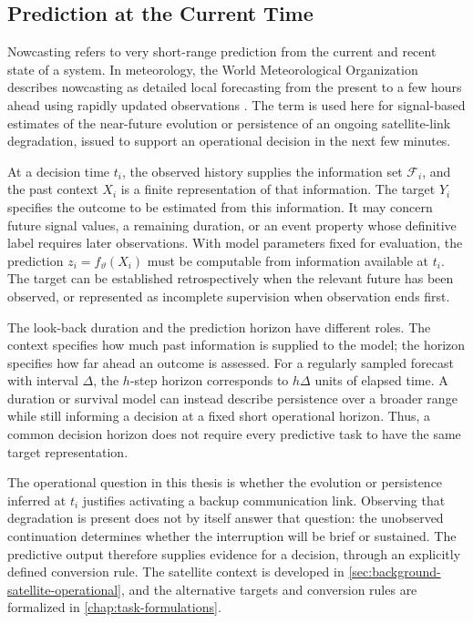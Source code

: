 \subsection{Prediction at the Current Time}

Nowcasting refers to very short-range prediction from the current and recent
state of a system. In meteorology, the World Meteorological Organization
describes nowcasting as detailed local forecasting from the present to a few
hours ahead using rapidly updated observations \cite{wmo2017nowcasting}.
The term is used here for signal-based estimates of the near-future evolution
or persistence of an ongoing satellite-link degradation, issued to support an
operational decision in the next few minutes.

At a decision time \(t_i\), the observed history supplies the information set
\(\mathcal{F}_i\), and the past context \(X_i\) is a finite representation of
that information. The target \(Y_i\) specifies the outcome to be estimated from
this information. It may concern future signal values, a remaining duration, or
an event property whose definitive label requires later observations. With model
parameters fixed for evaluation, the prediction \(z_i=f_\vartheta(X_i)\) must
be computable from information available at \(t_i\). The target can be
established retrospectively when the relevant future has been observed, or
represented as incomplete supervision when observation ends first.

The look-back duration and the prediction horizon have different roles. The
context specifies how much past information is supplied to the model; the
horizon specifies how far ahead an outcome is assessed. For a regularly sampled
forecast with interval \(\Delta\), the \(h\)-step horizon corresponds to
\(h\Delta\) units of elapsed time. A duration or survival model can instead
describe persistence over a broader range while still informing a decision at
a fixed short operational horizon. Thus, a common decision horizon does not
require every predictive task to have the same target representation.

The operational question in this thesis is whether the evolution or persistence
inferred at \(t_i\) justifies activating a backup communication link. Observing
that degradation is present does not by itself answer that question: the
unobserved continuation determines whether the interruption will be brief or
sustained. The predictive output therefore supplies evidence for a decision,
through an explicitly defined conversion rule. The satellite context is
developed in \cref{sec:background-satellite-operational}, and the alternative
targets and conversion rules are formalized in \cref{chap:task-formulations}.

